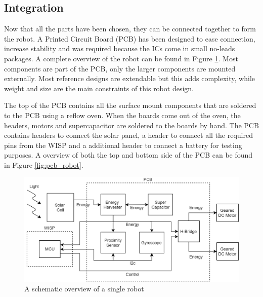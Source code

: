 \subsection{Integration}

Now that all the parts have been chosen, they can be connected together to form the robot.
A Printed Circuit Board (PCB) has been designed to ease connection, increase stability and was required because the ICs come in small no-leads packages.
A complete overview of the robot can be found in Figure \ref{fig:robot_overview}.
Most components are part of the PCB, only the larger components are mounted externally.
Most reference designs are extendable but this adds complexity, while weight and size are the main constraints of this robot design.


The top of the PCB contains all the surface mount components that are soldered to the PCB using a reflow oven. 
When the boards come out of the oven, the headers, motors and supercapacitor are soldered to the boards by hand.
The PCB contains headers to connect the solar panel, a header to connect all the required pins from the WISP and a additional header to connect a battery for testing purposes.
A overview of both the top and bottom side of the PCB can be found in Figure \ref{fig:pcb_robot}.


\begin{figure}
	\centering
	\includegraphics[width=\textwidth]{pics/schematic_robot_v2.png}
	\caption{A schematic overview of a single robot}
	\label{fig:robot_overview}
\end{figure}


